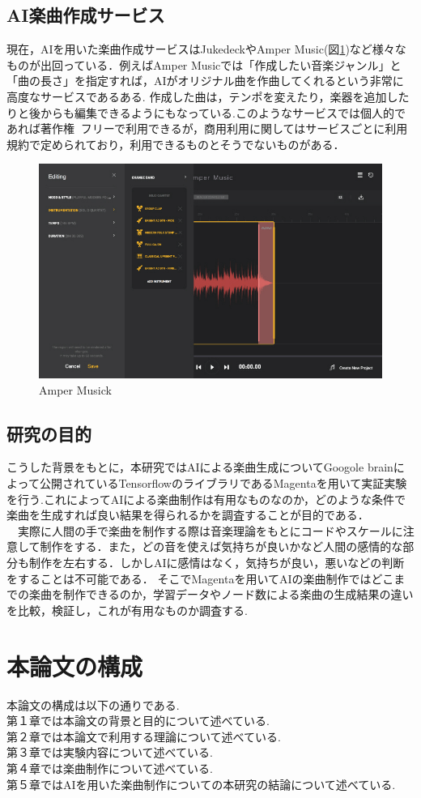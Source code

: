 \subsection{AI楽曲作成サービス}
現在，AIを用いた楽曲作成サービスはJukedeck\cite{webpage10}やAmper Music(図\ref{fig:Amper Music})\cite{webpage11}など様々なものが出回っている．例えばAmper Musicでは「作成したい音楽ジャンル」と「曲の長さ」を指定すれば，AIがオリジナル曲を作曲してくれるという非常に高度なサービスであるある. 
作成した曲は，テンポを変えたり，楽器を追加したりと後からも編集できるようにもなっている.このようなサービスでは個人的であれば著作権フリーで利用できるが，商用利用に関してはサービスごとに利用規約で定められており，利用できるものとそうでないものがある．\\
\begin{figure}[!ht]
    \begin{screen}
    \begin{center}
        \includegraphics[scale=1, clip]{./img/Amper1.jpg}
        \caption{Amper Musick}
        \label{fig:Amper Music}
    \end{center}
\end{screen}
\end{figure}
\newpage
\subsection{研究の目的}
こうした背景をもとに，本研究ではAIによる楽曲生成についてGoogole brainによって公開されているTensorflowのライブラリであるMagentaを用いて実証実験を行う.これによってAIによる楽曲制作は有用なものなのか，どのような条件で楽曲を生成すれば良い結果を得られるかを調査することが目的である．\\
　実際に人間の手で楽曲を制作する際は音楽理論をもとにコードやスケールに注意して制作をする．また，どの音を使えば気持ちが良いかなど人間の感情的な部分も制作を左右する．しかしAIに感情はなく，気持ちが良い，悪いなどの判断をすることは不可能である．
そこでMagentaを用いてAIの楽曲制作ではどこまでの楽曲を制作できるのか，学習データやノード数による楽曲の生成結果の違いを比較，検証し，これが有用なものか調査する.\\
\newpage
\section{本論文の構成}
本論文の構成は以下の通りである.\\
第１章では本論文の背景と目的について述べている.\\
第２章では本論文で利用する理論について述べている.\\
第３章では実験内容について述べている.\\
第４章では楽曲制作について述べている.\\
第５章ではAIを用いた楽曲制作についての本研究の結論について述べている.\\